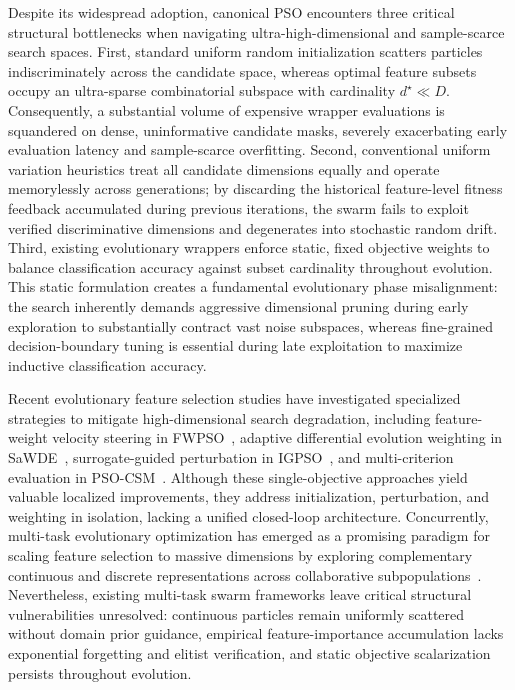 \documentclass[final,5p,times,fleqn]{elsarticle}
\begin{document}
Despite its widespread adoption, canonical PSO encounters three critical structural bottlenecks when navigating ultra-high-dimensional and sample-scarce search spaces. First, standard uniform random initialization scatters particles indiscriminately across the candidate space, whereas optimal feature subsets occupy an ultra-sparse combinatorial subspace with cardinality $d^{\star} \ll D$. Consequently, a substantial volume of expensive wrapper evaluations is squandered on dense, uninformative candidate masks, severely exacerbating early evaluation latency and sample-scarce overfitting. Second, conventional uniform variation heuristics treat all candidate dimensions equally and operate memorylessly across generations; by discarding the historical feature-level fitness feedback accumulated during previous iterations, the swarm fails to exploit verified discriminative dimensions and degenerates into stochastic random drift. Third, existing evolutionary wrappers enforce static, fixed objective weights to balance classification accuracy against subset cardinality throughout evolution. This static formulation creates a fundamental evolutionary phase misalignment: the search inherently demands aggressive dimensional pruning during early exploration to substantially contract vast noise subspaces, whereas fine-grained decision-boundary tuning is essential during late exploitation to maximize inductive classification accuracy.

Recent evolutionary feature selection studies have investigated specialized strategies to mitigate high-dimensional search degradation, including feature-weight velocity steering in FWPSO~\cite{wangjia2022}, adaptive differential evolution weighting in SaWDE~\cite{wang2022}, surrogate-guided perturbation in IGPSO~\cite{xuezhang2024}, and multi-criterion evaluation in PSO-CSM~\cite{wei2025}. Although these single-objective approaches yield valuable localized improvements, they address initialization, perturbation, and weighting in isolation, lacking a unified closed-loop architecture. Concurrently, multi-task evolutionary optimization has emerged as a promising paradigm for scaling feature selection to massive dimensions by exploring complementary continuous and discrete representations across collaborative subpopulations~\cite{mel2024}. Nevertheless, existing multi-task swarm frameworks leave critical structural vulnerabilities unresolved: continuous particles remain uniformly scattered without domain prior guidance, empirical feature-importance accumulation lacks exponential forgetting and elitist verification, and static objective scalarization persists throughout evolution.
\end{document}
